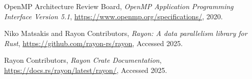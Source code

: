 \documentclass[12pt]{article}
\begin{document}
\newpage
\begin{thebibliography}{9}
    OpenMP Architecture Review Board, \textit{OpenMP Application Programming Interface Version 5.1},
    \url{https://www.openmp.org/specifications/}, 2020.

    Niko Matsakis and Rayon Contributors, \textit{Rayon: A data parallelism library for Rust},
    \url{https://github.com/rayon-rs/rayon}, Accessed 2025.

    Rayon Contributors, \textit{Rayon Crate Documentation}, \url{https://docs.rs/rayon/latest/rayon/}, Accessed 2025.
\end{thebibliography}
\end{document}
